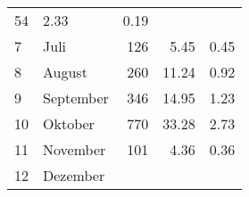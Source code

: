 \begin{longtable}{lXrrr}
       \num{54} &
       \num[round-mode=places,round-precision=2]{2.33} &
         \num[round-mode=places,round-precision=2]{0.19} \\

     7 &
     \multicolumn{1}{X}{ Juli   } &


       \num{126} &
       \num[round-mode=places,round-precision=2]{5.45} &
         \num[round-mode=places,round-precision=2]{0.45} \\

     8 &
     \multicolumn{1}{X}{ August   } &


       \num{260} &
       \num[round-mode=places,round-precision=2]{11.24} &
         \num[round-mode=places,round-precision=2]{0.92} \\

     9 &
     \multicolumn{1}{X}{ September   } &


       \num{346} &
       \num[round-mode=places,round-precision=2]{14.95} &
         \num[round-mode=places,round-precision=2]{1.23} \\

     10 &
     \multicolumn{1}{X}{ Oktober   } &


       \num{770} &
       \num[round-mode=places,round-precision=2]{33.28} &
         \num[round-mode=places,round-precision=2]{2.73} \\

     11 &
     \multicolumn{1}{X}{ November   } &


       \num{101} &
       \num[round-mode=places,round-precision=2]{4.36} &
         \num[round-mode=places,round-precision=2]{0.36} \\

     12 &
     \multicolumn{1}{X}{ Dezember   } &



\end{longtable}
